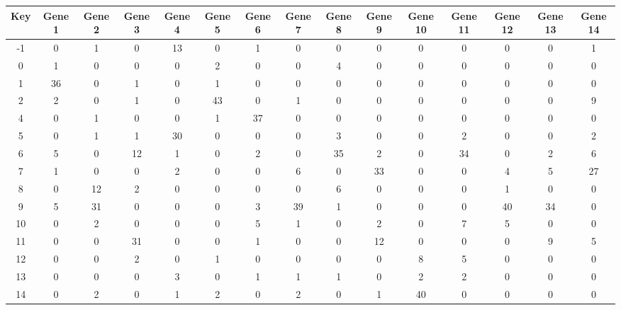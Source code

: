 \begin{tabular}{|c|c|c|c|c|c|c|c|c|c|c|c|c|c|c|}
\hline
Key & Gene 1 & Gene 2 & Gene 3 & Gene 4 & Gene 5 & Gene 6 & Gene 7 & Gene 8 & Gene 9 & Gene 10 & Gene 11 & Gene 12 & Gene 13 & Gene 14 \\
\hline
-1 & 0 & 1 & 0 & 13 & 0 & 1 & 0 & 0 & 0 & 0 & 0 & 0 & 0 & 1 \\
0 & 1 & 0 & 0 & 0 & 2 & 0 & 0 & 4 & 0 & 0 & 0 & 0 & 0 & 0 \\
1 & 36 & 0 & 1 & 0 & 1 & 0 & 0 & 0 & 0 & 0 & 0 & 0 & 0 & 0 \\
2 & 2 & 0 & 1 & 0 & 43 & 0 & 1 & 0 & 0 & 0 & 0 & 0 & 0 & 9 \\
4 & 0 & 1 & 0 & 0 & 1 & 37 & 0 & 0 & 0 & 0 & 0 & 0 & 0 & 0 \\
5 & 0 & 1 & 1 & 30 & 0 & 0 & 0 & 3 & 0 & 0 & 2 & 0 & 0 & 2 \\
6 & 5 & 0 & 12 & 1 & 0 & 2 & 0 & 35 & 2 & 0 & 34 & 0 & 2 & 6 \\
7 & 1 & 0 & 0 & 2 & 0 & 0 & 6 & 0 & 33 & 0 & 0 & 4 & 5 & 27 \\
8 & 0 & 12 & 2 & 0 & 0 & 0 & 0 & 6 & 0 & 0 & 0 & 1 & 0 & 0 \\
9 & 5 & 31 & 0 & 0 & 0 & 3 & 39 & 1 & 0 & 0 & 0 & 40 & 34 & 0 \\
10 & 0 & 2 & 0 & 0 & 0 & 5 & 1 & 0 & 2 & 0 & 7 & 5 & 0 & 0 \\
11 & 0 & 0 & 31 & 0 & 0 & 1 & 0 & 0 & 12 & 0 & 0 & 0 & 9 & 5 \\
12 & 0 & 0 & 2 & 0 & 1 & 0 & 0 & 0 & 0 & 8 & 5 & 0 & 0 & 0 \\
13 & 0 & 0 & 0 & 3 & 0 & 1 & 1 & 1 & 0 & 2 & 2 & 0 & 0 & 0 \\
14 & 0 & 2 & 0 & 1 & 2 & 0 & 2 & 0 & 1 & 40 & 0 & 0 & 0 & 0 \\
\hline
\end{tabular}